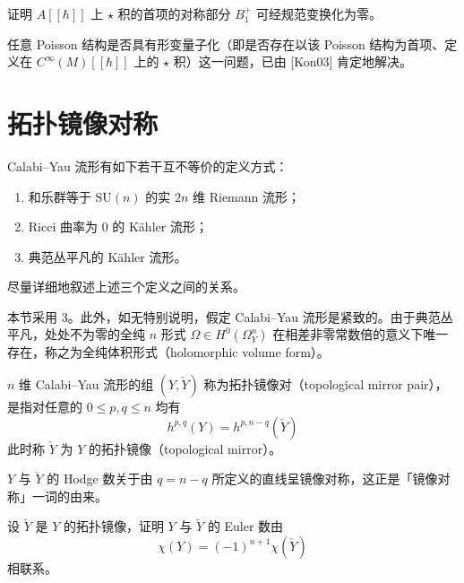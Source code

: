 \begin{exercise}
证明 $A[[\hbar]]$ 上 $\star$ 积的首项的对称部分 $B_1^+$ 可经规范变换化为零。
\end{exercise}

任意 Poisson 结构是否具有形变量子化（即是否存在以该 Poisson 结构为首项、定义在 $C^\infty(M)[[\hbar]]$ 上的 $\star$ 积）这一问题，已由 [Kon03] 肯定地解决。

\section{拓扑镜像对称}

Calabi--Yau 流形有如下若干互不等价的定义方式：
\begin{enumerate}
  \item 和乐群等于 $\mathrm{SU}(n)$ 的实 $2n$ 维 Riemann 流形；
  \item Ricci 曲率为 $0$ 的 Kähler 流形；
  \item 典范丛平凡的 Kähler 流形。
\end{enumerate}

\begin{exercise}
尽量详细地叙述上述三个定义之间的关系。
\end{exercise}

本节采用 3。此外，如无特别说明，假定 Calabi--Yau 流形是紧致的。由于典范丛平凡，处处不为零的全纯 $n$ 形式 $\Omega\in H^0(\Omega^n_Y)$ 在相差非零常数倍的意义下唯一存在，称之为全纯体积形式（holomorphic volume form）。

\begin{definition}
$n$ 维 Calabi--Yau 流形的组 $(Y,\check Y)$ 称为拓扑镜像对（topological mirror pair），是指对任意的 $0\le p,q\le n$ 均有
\begin{equation}
  h^{p,q}(Y)=h^{p,n-q}(\check Y)
  \tag{9.1}
\end{equation}
此时称 $\check Y$ 为 $Y$ 的拓扑镜像（topological mirror）。
\end{definition}

$Y$ 与 $\check Y$ 的 Hodge 数关于由 $q=n-q$ 所定义的直线呈镜像对称，这正是「镜像对称」一词的由来。

\begin{exercise}
设 $\check Y$ 是 $Y$ 的拓扑镜像，证明 $Y$ 与 $\check Y$ 的 Euler 数由
\begin{equation}
  \chi(Y)=(-1)^{n+1}\chi(\check Y)
  \tag{9.2}
\end{equation}
相联系。
\end{exercise}

